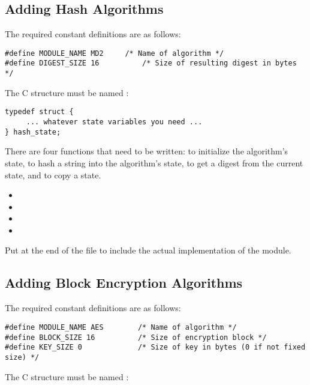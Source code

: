 \documentclass{howto}
\begin{document}
\subsection{Adding Hash Algorithms}

The required constant definitions are as follows:

\begin{verbatim}
#define MODULE_NAME MD2		/* Name of algorithm */
#define DIGEST_SIZE 16          /* Size of resulting digest in bytes */
\end{verbatim}

The C structure must be named :

\begin{verbatim}
typedef struct {
     ... whatever state variables you need ...
} hash_state;
\end{verbatim}

There are four functions that need to be written: to initialize the
algorithm's state, to hash a string into the algorithm's state, to get
a digest from the current state, and to copy a state.

\begin{itemize}
  \item {}
  \item {}
  \item {}
  \item {}
\end{itemize}

Put  at the end of the file to
include the actual implementation of the module.


\subsection{Adding Block Encryption Algorithms}

The required constant definitions are as follows:

\begin{verbatim}
#define MODULE_NAME AES	       /* Name of algorithm */
#define BLOCK_SIZE 16          /* Size of encryption block */
#define KEY_SIZE 0             /* Size of key in bytes (0 if not fixed size) */
\end{verbatim}

The C structure must be named :
\end{document}
